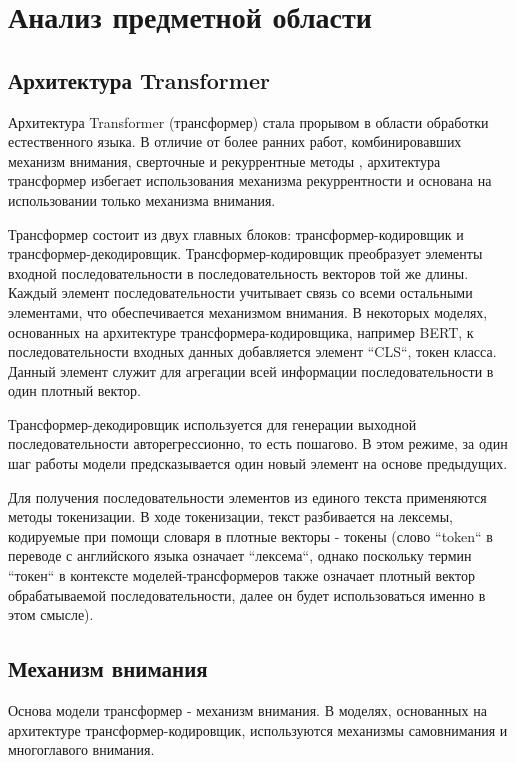 \documentclass[times,specification,annotation]{itmo-student-thesis}
\begin{document}
\chapter{Анализ предметной области}
\section{Архитектура Transformer}

Архитектура Transformer\cite{transformer} (трансформер) стала прорывом в области обработки естественного языка. В отличие от более ранних работ, комбинировавших механизм внимания, сверточные и рекуррентные методы \cite{lstm_cnn_attention_model}, архитектура трансформер избегает использования механизма рекуррентности и основана на использовании только механизма внимания.

Трансформер состоит из двух главных блоков: трансформер-кодировщик и трансформер-декодировщик. Трансформер-кодировщик преобразует элементы входной последовательности в последовательность векторов той же длины. Каждый элемент последовательности учитывает связь со всеми остальными элементами, что обеспечивается механизмом внимания. В некоторых моделях, основанных на архитектуре трансформера-кодировщика, например BERT\cite{bert}, к последовательности входных данных добавляется элемент ``CLS``, токен класса. Данный элемент служит для агрегации всей информации последовательности в один плотный вектор.

Трансформер-декодировщик используется для генерации выходной последовательности авторегрессионно, то есть пошагово. В этом режиме, за один шаг работы модели предсказывается один новый элемент на основе предыдущих. 

Для получения последовательности элементов из единого текста применяются методы токенизации. В ходе токенизации, текст разбивается на лексемы, кодируемые при помощи словаря в плотные векторы - токены (слово ``token`` в переводе с английского языка означает ``лексема``, однако поскольку термин ``токен`` в контексте моделей-трансформеров также означает плотный вектор обрабатываемой последовательности, далее он будет использоваться именно в этом смысле).

\section{Механизм внимания}

Основа модели трансформер - механизм внимания. В моделях, основанных на архитектуре трансформер-кодировщик, используются механизмы самовнимания и многоглавого внимания. 
\end{document}
